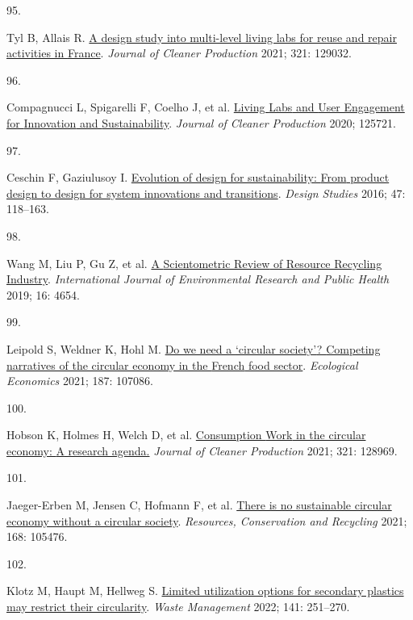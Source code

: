 \documentclass[
  11pt,
  a4paperpaper,
  onecolumn]{article}
\newlength{\cslhangindent}
\newlength{\csllabelwidth}
\newlength{\cslentryspacingunit} %
\newenvironment{CSLReferences}[2] %
 {%
  \setlength{\parindent}{0pt}
  \ifodd #1
  \let\oldpar\par
  \def\par{\hangindent=\cslhangindent\oldpar}
  \fi
  \setlength{\parskip}{#2\cslentryspacingunit}
 }%
 {}
\newcommand{\CSLLeftMargin}[1]{\parbox[t]{\csllabelwidth}{#1}}
\newcommand{\CSLRightInline}[1]{\parbox[t]{\linewidth - \csllabelwidth}{#1}\break}
\begin{document}
\begin{CSLReferences}{0}{0}
\leavevmode{}%
\CSLLeftMargin{95. }%
\CSLRightInline{Tyl B, Allais R.
\href{https://doi.org/10.1016/J.JCLEPRO.2021.129032}{A design study into
multi-level living labs for reuse and repair activities in {France}}.
\emph{Journal of Cleaner Production} 2021; 321: 129032.}

\leavevmode{}%
\CSLLeftMargin{96. }%
\CSLRightInline{Compagnucci L, Spigarelli F, Coelho J, et al.
\href{https://doi.org/10.1016/j.jclepro.2020.125721}{Living {Labs} and
{User Engagement} for {Innovation} and {Sustainability}}. \emph{Journal
of Cleaner Production} 2020; 125721.}

\leavevmode{}%
\CSLLeftMargin{97. }%
\CSLRightInline{Ceschin F, Gaziulusoy I.
\href{https://doi.org/10.1016/j.destud.2016.09.002}{Evolution of design
for sustainability: {From} product design to design for system
innovations and transitions}. \emph{Design Studies} 2016; 47: 118--163.}

\leavevmode{}%
\CSLLeftMargin{98. }%
\CSLRightInline{Wang M, Liu P, Gu Z, et al.
\href{https://doi.org/10.3390/ijerph16234654}{A {Scientometric Review}
of {Resource Recycling Industry}}. \emph{International Journal of
Environmental Research and Public Health} 2019; 16: 4654.}

\leavevmode{}%
\CSLLeftMargin{99. }%
\CSLRightInline{Leipold S, Weldner K, Hohl M.
\href{https://doi.org/10.1016/j.ecolecon.2021.107086}{Do we need a
{`circular society'}? {Competing} narratives of the circular economy in
the {French} food sector}. \emph{Ecological Economics} 2021; 187:
107086.}

\leavevmode{}%
\CSLLeftMargin{100. }%
\CSLRightInline{Hobson K, Holmes H, Welch D, et al.
\href{https://doi.org/10.1016/J.JCLEPRO.2021.128969}{Consumption {Work}
in the circular economy: {A} research agenda.} \emph{Journal of Cleaner
Production} 2021; 321: 128969.}

\leavevmode{}%
\CSLLeftMargin{101. }%
\CSLRightInline{Jaeger-Erben M, Jensen C, Hofmann F, et al.
\href{https://doi.org/10.1016/j.resconrec.2021.105476}{There is no
sustainable circular economy without a circular society}.
\emph{Resources, Conservation and Recycling} 2021; 168: 105476.}

\leavevmode{}%
\CSLLeftMargin{102. }%
\CSLRightInline{Klotz M, Haupt M, Hellweg S.
\href{https://doi.org/10.1016/J.WASMAN.2022.01.002}{Limited utilization
options for secondary plastics may restrict their circularity}.
\emph{Waste Management} 2022; 141: 251--270.}


\end{CSLReferences}
\end{document}
